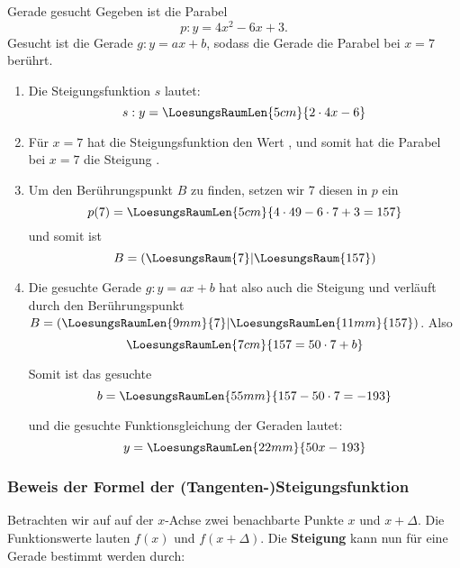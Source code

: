 \begin{beispiel}{Gerade gesucht}{}
Gegeben ist die Parabel $$p: y=4x^2 -6x + 3\text{.}$$ Gesucht ist die Gerade
$g: y=ax+b$, sodass die Gerade die Parabel bei $x=7$ berührt.

\begin{enumerate}
\item Die Steigungsfunktion $s$ lautet: $$s:
  y=\LoesungsRaumLen{5cm}{2\cdot{}4x - 6}$$
  
\item Für $x=7$ hat die Steigungsfunktion den Wert , und somit hat
  die Parabel bei $x=7$ die Steigung .

  
\item Um den Berührungspunkt $B$ zu finden, setzen wir 7 diesen in $p$
  ein
  $$p(7)= \LoesungsRaumLen{5cm}{4\cdot{}49-6\cdot{}7+3 = 157}$$
  und somit ist
  $$B=(\LoesungsRaum{7}|\LoesungsRaum{157})$$
  
\item Die gesuchte Gerade $g: y=ax+b$ hat also auch die Steigung 
  und verläuft durch den Berührungspunkt $B=(\LoesungsRaumLen{9mm}{7}|\LoesungsRaumLen{11mm}{157})$. Also
  $$\LoesungsRaumLen{7cm}{157=50\cdot{}7+b}$$

  Somit ist das gesuchte
  $$b = \LoesungsRaumLen{55mm}{157-50\cdot{}7=-193}$$
  
  und die gesuchte Funktionsgleichung der Geraden lautet: $$y = \LoesungsRaumLen{22mm}{50x-193}$$
  \end{enumerate}
\end{beispiel}

\newpage

\subsubsection{Beweis der Formel der (Tangenten-)Steigungsfunktion}

Betrachten wir auf auf der $x$-Achse zwei benachbarte Punkte $x$ und
$x+\Delta$. Die Funktionswerte lauten $f(x)$ und $f(x+\Delta)$. Die
\textbf{Steigung} kann nun für eine Gerade bestimmt werden durch:

